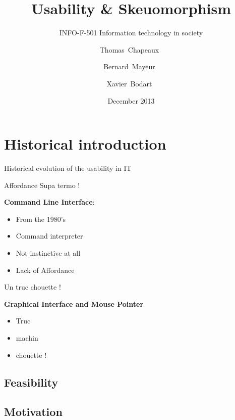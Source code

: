 \documentclass{beamer}
\title {Usability \& Skeuomorphism}
\subtitle {INFO-F-501 Information technology in society}
\author{Thomas~Chapeaux~\inst{1} \and Bernard~Mayeur~\inst{1}\and Xavier~Bodart~\inst{1}}
\institute[shortinst]{\inst{1} Université Libre de Bruxelles \\ Belgium}
\date{December 2013}
\begin{document}
\maketitle{}

\begin{frame}
    \tableofcontents[hideallsubsections]
\end{frame}

\section{Historical introduction}
\begin{frame}
\end{frame}
	\begin{frame}{Historical evolution of the usability in IT}
  \begin{block}{Affordance}
  Supa termo !
  \end{block}
\textbf{Command Line Interface}:
		\begin{itemize}
		\item From the 1980's
		\item Command interpreter
		\item Not instinctive at all
		\item Lack of Affordance
		\end{itemize}
		\end{frame}
\begin{frame}
\begin{block}
Un truc chouette !
\end{block}
\textbf{Graphical Interface and Mouse Pointer}
\begin{itemize}
\item Truc 
\item machin
\item chouette !
\end{itemize}
\end{frame}

    \subsection{Feasibility}

    \subsection{Motivation}




\end{document}
